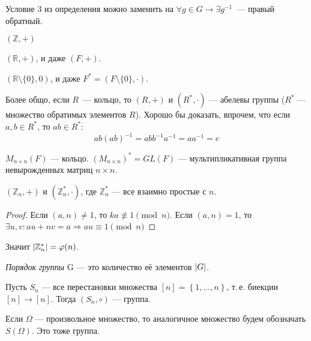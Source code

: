 \begin{exercise}
  Условие 3 из определения можно заменить на $\forall g \in G \to \exists g^{-1}$~--- правый обратный.
\end{exercise}

\begin{example}
	$(\mathbb{Z}, +)$
\end{example}

\begin{example}
  $(\mathbb{R}, +)$, и даже $(F, +)$.
\end{example}

\begin{example}
  $(\mathbb{R}\setminus\{0\}, 0)$, и даже $F^* = (F\setminus\{0\}, \cdot)$.
\end{example}

\begin{remark*}
  Более общо, если $R$~--- кольцо, то $(R, +)$ и $(R^*, \cdot)$ --- абелевы группы ($R^*$ --- множество обратимых элементов $R$).
  Хорошо бы доказать, впрочем, что если $a, b \in R^*$, то $ab \in R^*$:
  \begin{equation*}
	ab(ab)^{-1} = abb^{-1}a^{-1} = aa^{-1} = e
  \end{equation*}
\end{remark*}

\begin{example}
  $M_{n\times n}(F)$ --- кольцо. $(M_{n\times n})^* = GL(F)$ --- мультипликативная группа невырожденных матриц $n\times n$.
\end{example}

\begin{example}
  $(\mathbb{Z}_n, +)$ и $(\mathbb{Z}_n^*, \cdot)$, где $\mathbb{Z}_n^*$ --- все взаимно простые с $n$.
\end{example}

\begin{proof}
  Если $(a, n) \neq 1$, то $ka \not\equiv 1 \pmod{n}$. Если $(a, n) = 1$, то $\exists u, v: au + nv = a	\Rightarrow	au \equiv 1 \pmod{n}$
\end{proof}
Значит $\left\lvert \mathbb{Z}_n^* \right\rvert = \varphi(n)$.

\begin{define*}
  \emph{Порядок группы} G --- это количество её элементов $\left\lvert G \right\rvert$.
\end{define*}

\begin{example}
  Пусть $S_n$ --- все перестановки множества $[n] = \left\{ 1, \ldots, n \right\}$, т.\,е. биекции $[n] \to [n]$. Тогда $(S_n, \circ)$ --- группа.

  Если $\Omega$ --- произвольное множество, то аналогичное множество будем обозначать $S(\Omega)$. Это тоже группа.
\end{example}

